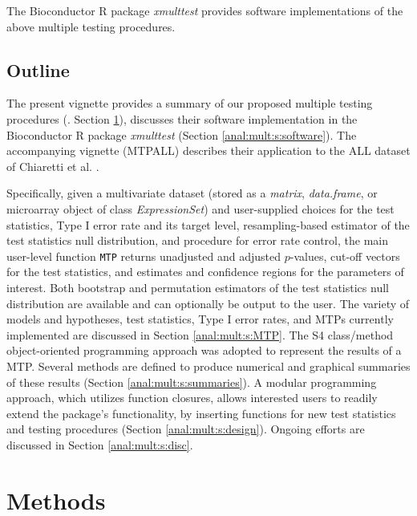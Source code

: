 \documentclass[11pt]{article}
\newcommand{\Rpackage}[1]{\textit{#1}}
\newcommand{\Robject}[1]{\texttt{#1}}
\newcommand{\Rclass}[1]{\textit{#1}}
\begin{document}
The Bioconductor R package \Rpackage{xmulttest} provides software implementations of the above multiple testing procedures. 

\subsection{Outline}

The present vignette provides a summary of our proposed multiple testing procedures (\cite{Dudoit&vdLaanMTBook,DudoitetalMT1SAGMB04,vdLaanetalMT2SAGMB04,vdLaanetalMT3SAGMB04,Pollard&vdLaanJSPI04}. Section \ref{anal:mult:s:methods}), 
discusses their software implementation in the Bioconductor R package \Rpackage{xmulttest} (Section \ref{anal:mult:s:software}). 
The accompanying vignette (MTPALL) describes their application to the ALL dataset of Chiaretti et al. \cite{Chiarettietal04}.

Specifically, given a multivariate dataset (stored as a \Rclass{matrix}, \Rclass{data.frame}, or microarray object of class \Rclass{ExpressionSet}) 
and user-supplied choices for the test statistics, Type I error rate and its target level, resampling-based estimator of the test statistics null distribution, and procedure for error rate control, the main user-level function \Robject{MTP} returns unadjusted and adjusted $p$-values, cut-off vectors for the test statistics, and estimates and confidence regions for the parameters of interest. 
Both bootstrap and permutation estimators of the test statistics null distribution are available and can optionally be output to the user. 
The variety of models and hypotheses, test statistics, Type I error rates, and MTPs currently implemented are discussed in Section \ref{anal:mult:s:MTP}.
The S4 class/method object-oriented programming approach was adopted to represent the results of a MTP. 
Several methods are defined to produce numerical and graphical summaries of these results (Section \ref{anal:mult:s:summaries}).
A modular programming approach, which utilizes function closures, allows interested users to readily extend the package's functionality, 
by inserting functions for new test statistics and testing procedures (Section \ref{anal:mult:s:design}).
Ongoing efforts are discussed in Section \ref{anal:mult:s:disc}.

\section{Methods}
\label{anal:mult:s:methods}
\end{document}
